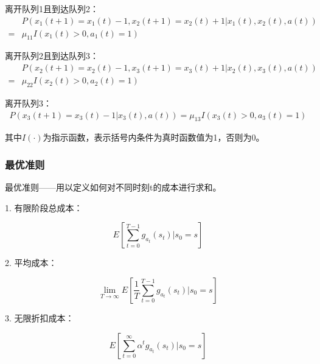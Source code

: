 \begin{example}
    离开队列1且到达队列2：
    \begin{equation}
        \begin{aligned}
             & P(x_1(t+1)=x_1(t)-1,x_2(t+1)=x_2(t)+1|x_1(t),x_2(t),a(t)) \\=&\mu_{11}I(x_1(t)>0,a_1(t)=1)
        \end{aligned}
    \end{equation}

    离开队列2且到达队列3：
    \begin{equation}
        \begin{aligned}
             & P(x_2(t+1)=x_2(t)-1,x_3(t+1)=x_3(t)+1|x_2(t),x_3(t),a(t)) \\=&\mu_{22}I(x_2(t)>0,a_2(t)=1)
        \end{aligned}
    \end{equation}

    离开队列3：
    \begin{equation}
        \begin{aligned}
            P(x_3(t+1)=x_3(t)-1|x_3(t),a(t))=\mu_{13}I(x_3(t)>0,a_3(t)=1)
        \end{aligned}
    \end{equation}

    其中$I(\cdot)$为指示函数，表示括号内条件为真时函数值为1，否则为0。


\end{example}

\subsubsection{最优准则}

最优准则——用以定义如何对不同时刻t的成本进行求和。

1. 有限阶段总成本：

\begin{equation}
    E[\sum_{t=0}^{T-1}g_{a_t}(s_t)|s_0=s]
\end{equation}

2. 平均成本：

\begin{equation}
    \lim_{T\rightarrow \infty}E[\frac{1}{T}\sum_{t=0}^{T-1}g_{a_t}(s_t)|s_0=s]
\end{equation}

3. 无限折扣成本：

\begin{equation}
    E[\sum_{t=0}^{\infty}\alpha^tg_{a_t}(s_t)|s_0=s]
\end{equation}

